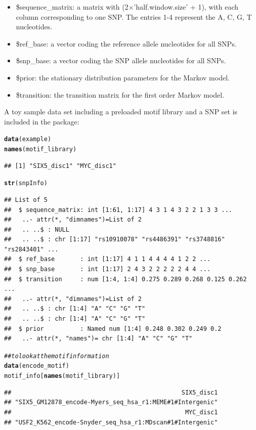 \documentclass[a4paper,10pt]{article}\usepackage[]{graphicx}\usepackage[]{color}
\makeatletter
\newcommand{\hlcom}[1]{\textcolor[rgb]{0.678,0.584,0.686}{\textit{#1}}}%
\newcommand{\hlstd}[1]{\textcolor[rgb]{0.345,0.345,0.345}{#1}}%
\newcommand{\hlkwd}[1]{\textcolor[rgb]{0.737,0.353,0.396}{\textbf{#1}}}%
\newenvironment{kframe}{%
 \def\at@end@of@kframe{}%
 \ifinner\ifhmode%
  \def\at@end@of@kframe{\end{minipage}}%
  \begin{minipage}{\columnwidth}%
 \fi\fi%
 \def\FrameCommand##1{\hskip\@totalleftmargin \hskip-\fboxsep
 \colorbox{shadecolor}{##1}\hskip-\fboxsep
     \hskip-\linewidth \hskip-\@totalleftmargin \hskip\columnwidth}%
 \MakeFramed {\advance\hsize-\width
   \@totalleftmargin\z@ \linewidth\hsize
   \@setminipage}}%
 {\par\unskip\endMakeFramed%
 \at@end@of@kframe}
\newenvironment{knitrout}{}{} %
\makeatother
\begin{document}
\begin{itemize}
\item \$sequence\_matrix: a matrix with (2$\times$'half.window.size' + 1), with each column corresponding to one SNP. The entries 1-4 represent the A, C, G, T nucleotides.
\item \$ref\_base: a vector coding the reference allele nucleotides for all SNPs.
\item \$snp\_base: a vector coding the SNP allele nucleotides for all SNPs.
\item \$prior: the stationary distribution parameters for the Markov model.
\item \$transition: the transition matrix for the first order Markov model.
\end{itemize}

A toy sample data set including a preloaded motif library and a SNP set is included in the package:

\begin{knitrout}
\color{fgcolor}\begin{kframe}
\begin{alltt}
\hlkwd{data}\hlstd{(example)}
\hlkwd{names}\hlstd{(motif_library)}
\end{alltt}
\begin{verbatim}
## [1] "SIX5_disc1" "MYC_disc1"
\end{verbatim}
\begin{alltt}
\hlkwd{str}\hlstd{(snpInfo)}
\end{alltt}
\begin{verbatim}
## List of 5
##  $ sequence_matrix: int [1:61, 1:17] 4 3 1 4 3 2 2 1 3 3 ...
##   ..- attr(*, "dimnames")=List of 2
##   .. ..$ : NULL
##   .. ..$ : chr [1:17] "rs10910078" "rs4486391" "rs3748816" "rs2843401" ...
##  $ ref_base       : int [1:17] 4 1 1 4 4 4 4 1 2 2 ...
##  $ snp_base       : int [1:17] 2 4 3 2 2 2 2 2 4 4 ...
##  $ transition     : num [1:4, 1:4] 0.275 0.289 0.268 0.125 0.262 ...
##   ..- attr(*, "dimnames")=List of 2
##   .. ..$ : chr [1:4] "A" "C" "G" "T"
##   .. ..$ : chr [1:4] "A" "C" "G" "T"
##  $ prior          : Named num [1:4] 0.248 0.302 0.249 0.2
##   ..- attr(*, "names")= chr [1:4] "A" "C" "G" "T"
\end{verbatim}
\begin{alltt}
\hlcom{## to look at the motif information}
\hlkwd{data}\hlstd{(encode_motif)}
\hlstd{motif_info[}\hlkwd{names}\hlstd{(motif_library)]}
\end{alltt}
\begin{verbatim}
##                                               SIX5_disc1 
## "SIX5_GM12878_encode-Myers_seq_hsa_r1:MEME#1#Intergenic" 
##                                                MYC_disc1 
## "USF2_K562_encode-Snyder_seq_hsa_r1:MDscan#1#Intergenic"
\end{verbatim}
\end{kframe}
\end{knitrout}
\end{document}
